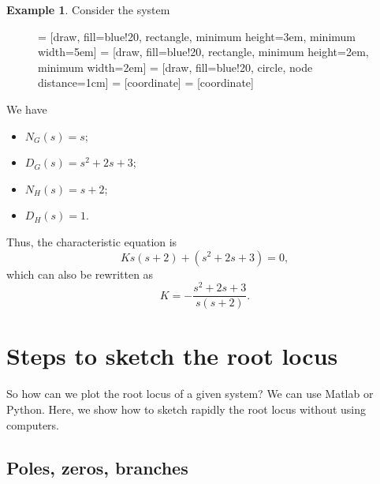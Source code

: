 \documentclass[a4paper,11pt]{report}
\theoremstyle{definition}
\newtheorem{mdexample}{Example}
\newenvironment{example}%
  {\vspace{0.1cm}\begin{mdframed}[backgroundcolor=lightgray]\begin{mdexample}}%
  {\end{mdexample}\end{mdframed}\vspace{0.1cm}}
\begin{document}
\begin{example}
  \label{ex:rl}
  Consider the system
  \begin{figure}[H]
    \centering
     = [draw, fill=blue!20, rectangle, minimum height=3em, minimum width=5em]
     = [draw, fill=blue!20, rectangle, minimum height=2em, minimum width=2em]
     = [draw, fill=blue!20, circle, node distance=1cm]
     = [coordinate]
     = [coordinate]
  \end{figure}
  We have 
  \begin{itemize}
    \item $N_G(s)=s$;
    \item $D_G(s)=s^2+2s+3$;
    \item $N_H(s)=s+2$;
    \item $D_H(s)=1$.
    \end{itemize}
  Thus, the characteristic equation is
  \[
  Ks(s+2)+(s^2+2s+3)=0,
  \]
  which can also be rewritten as
  \[
  K = -\frac{s^2+2s+3}{s(s+2)}.
  \]

\end{example}


\section{Steps to sketch the root locus}

So how can we plot the root locus of a given system? We can use Matlab
or Python. Here, we show how to sketch rapidly the root locus without
using computers.

\subsection{Poles, zeros, branches}
\end{document}
